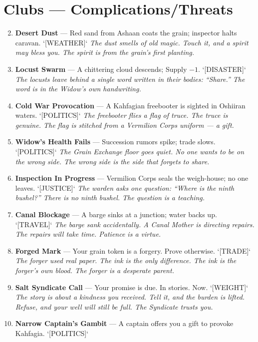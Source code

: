 \section*{Clubs --- Complications/Threats}
\label{sec:oshiira-complications}
\begin{enumerate}
\setcounter{enumi}{1}
\item \textbf{Desert Dust} --- Red sand from Ashaan coats the grain; inspector halts caravan. `[WEATHER]`
  \hfill \textit{The dust smells of old magic. Touch it, and a spirit may bless you. The spirit is from the grain's first planting.}
\item \textbf{Locust Swarm} --- A chittering cloud descends; Supply $-1$. `[DISASTER]`
  \hfill \textit{The locusts leave behind a single word written in their bodies: ``Share.'' The word is in the Widow's own handwriting.}
\item \textbf{Cold War Provocation} --- A Kahfagian freebooter is sighted in Oshiiran waters. `[POLITICS]`
  \hfill \textit{The freebooter flies a flag of truce. The truce is genuine. The flag is stitched from a Vermilion Corps uniform --- a gift.}
\item \textbf{Widow's Health Fails} --- Succession rumors spike; trade slows. `[POLITICS]`
  \hfill \textit{The Grain Exchange floor goes quiet. No one wants to be on the wrong side. The wrong side is the side that forgets to share.}
\item \textbf{Inspection In Progress} --- Vermilion Corps seals the weigh-house; no one leaves. `[JUSTICE]`
  \hfill \textit{The warden asks one question: ``Where is the ninth bushel?'' There is no ninth bushel. The question is a teaching.}
\item \textbf{Canal Blockage} --- A barge sinks at a junction; water backs up. `[TRAVEL]`
  \hfill \textit{The barge sank accidentally. A Canal Mother is directing repairs. The repairs will take time. Patience is a virtue.}
\item \textbf{Forged Mark} --- Your grain token is a forgery. Prove otherwise. `[TRADE]`
  \hfill \textit{The forger used real paper. The ink is the only difference. The ink is the forger's own blood. The forger is a desperate parent.}
\item \textbf{Salt Syndicate Call} --- Your promise is due. In stories. Now. `[WEIGHT]`
  \hfill \textit{The story is about a kindness you received. Tell it, and the burden is lifted. Refuse, and your well will still be full. The Syndicate trusts you.}
\item \textbf{Narrow Captain's Gambit} --- A captain offers you a gift to provoke Kahfagia. `[POLITICS]`

\end{enumerate}
